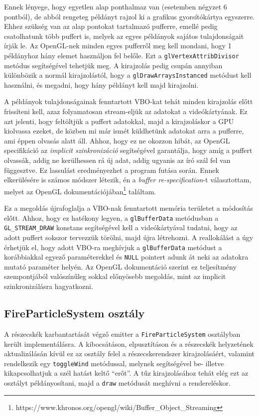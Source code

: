 Ennek lényege, hogy egyetlen alap ponthalmaz van (esetemben négyzet 6 pontból), de abból rengeteg példányt rajzol ki a grafikus gyorsítókártya egyszerre. Ehhez szükség van az alap pontokat tartalmazó pufferre, emellé pedig csatolhatunk több puffert is, melyek az egyes példányok sajátos tulajdonságait írják le. Az OpenGL-nek minden egyes pufferről meg kell mondani, hogy 1 példányhoz hány elemet használjon fel belőle. Ezt a \texttt{glVertexAttribDivisor} metódus segítségével tehetjük meg. A kirajzolás pedig csupán annyiban különbözik a normál kirajzolástól, hogy a \texttt{glDrawArraysInstanced} metódust kell használni, és megadni, hogy hány példányt kell majd kirajzolni.

A példányok tulajdonságainak fenntartott VBO-kat tehát minden kirajzolás előtt frissíteni kell, azaz folyamatosan stream-eljük az adatokat a videókártyának. Ez azt jelenti, hogy feltöltjük a puffert adatokkal, majd a kirajzoláskor a GPU kiolvassa ezeket, de közben mi már ismét küldhetünk adatokat arra a pufferre, ami éppen olvasás alatt áll. Ahhoz, hogy ez ne okozzon hibát, az OpenGL specifikáció az \textit{implicit szinkronizáció} segítségével garantálja, hogy amíg a puffert olvassák, addig ne kerülhessen rá új adat, addig ugyanis az író szál fel van függesztve. Ez lassulást eredményezhet a program futása során. Ennek elkerülésére is számos módszer létezik, én a \textit{buffer re-specification}-t választottam, melyet az OpenGL dokumentációjában\footnote{https://www.khronos.org/opengl/wiki/Buffer\_Object\_Streaming} találtam.

 Ez a megoldás újrafoglalja a VBO-nak fenntartott memória területet a módosítás előtt. Ahhoz, hogy ez hatékony legyen, a \texttt{glBufferData} metódusban a \texttt{GL\_STREAM\_DRAW} konstans segítségével kell a videókártyával tudatni, hogy az adott puffert sokszor tervezzük törölni, majd újra létrehozni. A reallokálást a úgy érhetjük el, hogy adott VBO-ra meghívjuk a \texttt{glBufferData} metódust a korábbiakkal egyező paraméterekkel és \texttt{NULL} pointert adunk át neki az adatokra mutató paraméter helyén. Az OpenGL dokumentáció szerint ez teljesítmény szempontjából valószínűleg sokkal előnyösebb megoldás, mint az implicit szinkronizálásra hagyatkozni.

\subsection{FireParticleSystem osztály}
A részecskék karbantartását végző emitter a \texttt{FireParticleSystem} osztályban került implementálásra. A kibocsátáson, elpusztításon és a részecskék helyzetének aktualizálásán kívül ez az osztály felel a részecskerendszer kirajzolásáért, valamint rendelkezik egy \texttt{toggleWind} metódussal, melynek segítségével be- illetve kikapcsolhatjuk a szél hatást keltő ``erőt''. A tűz kirajzolásához tehát elég ezt az osztályt példányosítani, majd a \texttt{draw} metódusát meghívni a rendereléskor.

